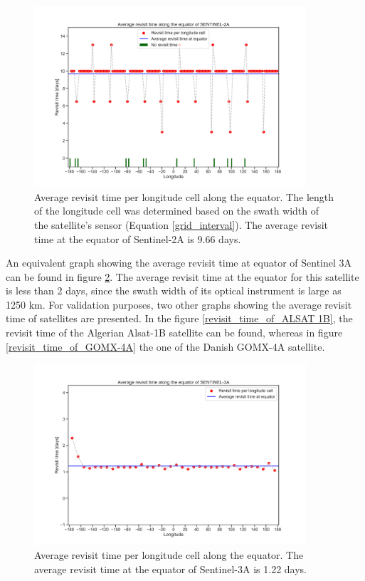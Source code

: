 \begin{figure}
\centering
\includegraphics[width=0.9\textwidth]{Images/revisit_time_of_SENTINEL-2A.png}\caption{Average revisit time per longitude cell along the equator. The length of the longitude cell was determined based on the swath width of the satellite's sensor (Equation \ref{grid_interval}). The average revisit time at the equator of Sentinel-2A is 9.66 days.}
\label{revisit_time_Sentinel2A}
\end{figure}

An equivalent graph showing the average revisit time at equator of Sentinel 3A can be found in figure \ref{revisit_time_Sentinel3A}. The average revisit time at the equator for this satellite is less than 2 days, since the swath width of its optical instrument is large as 1250 km. For validation purposes, two other graphs showing the average revisit time of satellites are presented. In the figure \ref{revisit_time_of_ALSAT 1B}, the revisit time of the Algerian Alsat-1B satellite can be found, whereas in figure \ref{revisit_time_of_GOMX-4A} the one of the Danish GOMX-4A satellite.

\begin{figure}
\centering
\includegraphics[width=0.9\textwidth]{Images/revisit_time_of_SENTINEL-3A.png}\caption{Average revisit time per longitude cell along the equator. The average revisit time at the equator of Sentinel-3A is 1.22 days.}
\label{revisit_time_Sentinel3A}
\end{figure}

